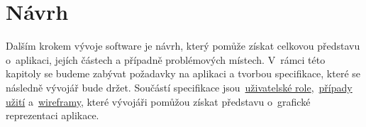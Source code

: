 \chapter{Návrh}
\label{ch:design}
Dalším krokem vývoje software je návrh, který pomůže získat celkovou představu o~aplikaci, jejích částech a případně problémových místech. V~rámci této kapitoly se budeme zabývat požadavky na aplikaci a tvorbou specifikace, které se následně vývojář bude držet. Součástí specifikace jsou~\hyperref[sc:user_roles]{uživatelské role},~\hyperref[sc:use_cases]{případy užití} a~\hyperref[sc:wireframes]{wireframy}, které vývojáři pomůžou získat představu o~grafické reprezentaci aplikace.







\newpage




